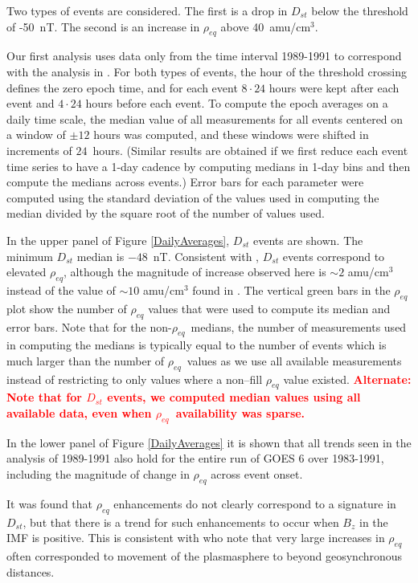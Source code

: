 \documentclass[10pt,twocolumn]{article}
\newcommand{\vinote}[1]{\textcolor{red}{\textbf{#1}}} %
\newcommand{\req}{\ensuremath{\rho_{eq}}}
\newcommand{\inote}[1]{\textcolor{blue}{\textbf{#1}}} %
\def\note#1\par{\textcolor{blue}{\textbf{#1}}\\}
\begin{document}
Two types of events are considered. The first is a drop in $D_{st}$ below the threshold of -50~nT.  The second is an increase in $\rho_{eq}$ above 40~amu/cm$^3$.

Our first analysis uses data only from the time interval 1989-1991 to correspond with the analysis in \cite{Takahashi2010}. For both types of events, the hour of the threshold crossing defines the zero epoch time, and for each event $8\cdot24$ hours were kept after each event and $4\cdot24$ hours before each event.  To compute the epoch averages on a daily time scale, the median value of all measurements for all events centered on a window of $\pm 12$ hours was computed, and these windows were shifted in increments of $24$~hours. (Similar results are obtained if we first reduce each event time series to have a 1-day cadence by computing medians in 1-day bins and then compute the medians across events.)  Error bars for each parameter were computed using the standard deviation of the values used in computing the median divided by the square root of the number of values used.

In the upper panel of Figure \ref{DailyAverages}, $D_{st}$ events are shown.  The minimum $D_{st}$ median is $-48$~nT.  Consistent with \cite{Takahashi2010}, $D_{st}$ events correspond to elevated $\rho_{eq}$, although the magnitude of increase observed here is $\sim 2$ amu/cm$^3$ instead of the value of $\sim 10$ amu/cm$^3$ found in \cite{Takahashi2010}.  The vertical green bars in the $\rho_{eq}$ plot show the number of $\rho_{eq}$ values that were used to compute its median and error bars.  Note that for the non-\req\ medians, the number of measurements used in computing the medians is typically equal to the number of events which is much larger than the number of \req\ values as we use all available measurements instead of restricting to only values where a non--fill $\rho_{eq}$ value existed. \vinote{Alternate: Note that for $D_{st}$ events, we computed median values using all available data, even when \req\ availability was sparse.}

In the lower panel of Figure \ref{DailyAverages} it is shown that all trends seen in the analysis of 1989-1991 also hold for the entire run of GOES 6 over 1983-1991, including the magnitude of change in $\rho_{eq}$ across event onset.

It was found that $\rho_{eq}$ enhancements do not clearly correspond to a signature in $D_{st}$, but that there is a trend for such enhancements to occur when $B_{z}$ in the IMF is positive.  This is consistent with \cite{Takahashi2010} who note that very large increases in $\rho_{eq}$ often corresponded to movement of the plasmasphere to beyond geosynchronous distances. 
\end{document}

